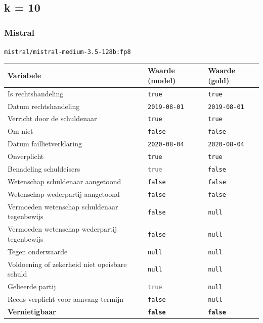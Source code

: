 \documentclass[
  dutch,
  a4paper,
]{article}
\begin{document}
\newpage


\subsection{k = 10}\label{k-10-4}

\subsubsection{Mistral}\label{mistral-14}

\texttt{mistral/mistral-medium-3.5-128b:fp8}

\begin{center}
\small
\begin{tabular}{@{}p{7.4cm}p{2.6cm}p{2.6cm}@{}}
\toprule
Variabele & Waarde (model) & Waarde (gold) \\
\midrule
Is rechtshandeling & \texttt{true} & \texttt{true} \\
Datum rechtshandeling & \texttt{2019-08-01} & \texttt{2019-08-01} \\
Verricht door de schuldenaar & \texttt{true} & \texttt{true} \\
Om niet & \texttt{false} & \texttt{false} \\
Datum faillietverklaring & \texttt{2020-08-04} & \texttt{2020-08-04} \\
Onverplicht & \texttt{true} & \texttt{true} \\
Benadeling schuldeisers & \textcolor{gray}{\texttt{true}} & \texttt{false} \\
Wetenschap schuldenaar aangetoond & \texttt{false} & \texttt{false} \\
Wetenschap wederpartij aangetoond & \texttt{false} & \texttt{false} \\
Vermoeden wetenschap schuldenaar tegenbewijs & \texttt{false} & \texttt{null} \\
Vermoeden wetenschap wederpartij tegenbewijs & \texttt{false} & \texttt{null} \\
Tegen onderwaarde & \texttt{null} & \texttt{null} \\
Voldoening of zekerheid niet opeisbare schuld & \texttt{null} & \texttt{null} \\
Gelieerde partij & \textcolor{gray}{\texttt{true}} & \texttt{null} \\
Reeds verplicht voor aanvang termijn & \texttt{false} & \texttt{null} \\
\textbf{Vernietigbaar} & \textbf{\texttt{false}} & \textbf{\texttt{false}} \\
\bottomrule
\end{tabular}
\end{center}
\end{document}
